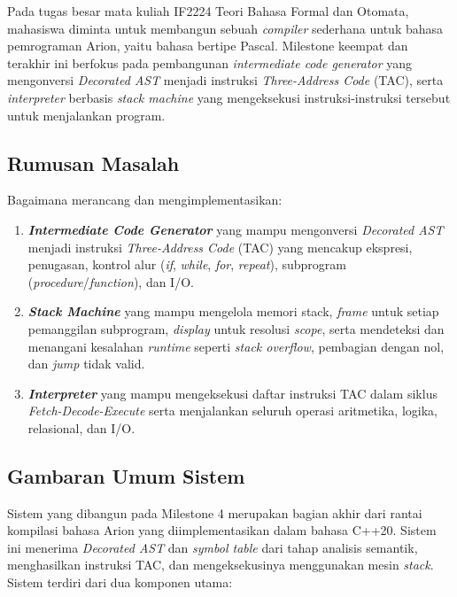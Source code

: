 \documentclass[12pt,a4paper]{article}
\begin{document}
Pada tugas besar mata kuliah IF2224 Teori Bahasa Formal dan Otomata, mahasiswa
diminta untuk membangun sebuah \textit{compiler} sederhana untuk bahasa
pemrograman Arion, yaitu bahasa bertipe Pascal. Milestone keempat dan terakhir
ini berfokus pada pembangunan \textit{intermediate code generator} yang
mengonversi \textit{Decorated AST} menjadi instruksi \textit{Three-Address
Code} (TAC), serta \textit{interpreter} berbasis \textit{stack machine} yang
mengeksekusi instruksi-instruksi tersebut untuk menjalankan program.

\subsection{Rumusan Masalah}

Bagaimana merancang dan mengimplementasikan:

\begin{enumerate}[label=\arabic*.]
    \item \textbf{\textit{Intermediate Code Generator}} yang mampu
        mengonversi \textit{Decorated AST} menjadi instruksi \textit{Three-Address
        Code} (TAC) yang mencakup ekspresi, penugasan, kontrol alur
        (\textit{if}, \textit{while}, \textit{for}, \textit{repeat}),
        subprogram (\textit{procedure}/\textit{function}), dan I/O.
    \item \textbf{\textit{Stack Machine}} yang mampu mengelola memori stack,
        \textit{frame} untuk setiap pemanggilan subprogram, \textit{display}
        untuk resolusi \textit{scope}, serta mendeteksi dan menangani
        kesalahan \textit{runtime} seperti \textit{stack overflow}, pembagian
        dengan nol, dan \textit{jump} tidak valid.
    \item \textbf{\textit{Interpreter}} yang mampu mengeksekusi daftar
        instruksi TAC dalam siklus \textit{Fetch-Decode-Execute} serta
        menjalankan seluruh operasi aritmetika, logika, relasional, dan I/O.
\end{enumerate}

\subsection{Gambaran Umum Sistem}

Sistem yang dibangun pada Milestone 4 merupakan bagian akhir dari rantai
kompilasi bahasa Arion yang diimplementasikan dalam bahasa C++20. Sistem ini
menerima \textit{Decorated AST} dan \textit{symbol table} dari tahap analisis
semantik, menghasilkan instruksi TAC, dan mengeksekusinya menggunakan mesin
\textit{stack}. Sistem terdiri dari dua komponen utama:
\end{document}
